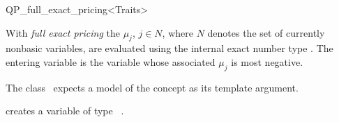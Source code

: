 
\begin{ccRefClass}{QP_full_exact_pricing<Traits>}

\ccDefinition
With \emph{full exact pricing} the $\mu_{j}$, $j \in N$, where $N$ denotes the
set of currently nonbasic variables, are evaluated using the
internal exact number type . The entering variable is the variable
whose associated $\mu_{j}$ is most negative.


\ccInheritsFrom
{}

\ccRequirements
\ccIndexRequirements

The class \ccRefName\ expects a model of the concept
 as its template argument. 

\ccTypes \ccIndexClassTypes


\ccCreation
\ccIndexClassCreation
{}

\ccConstructor{ ( );}
{creates a variable of type \ccRefName\ .}


\ccUnchecked

\ccAccessFunctions
\begin{ccIndexMemberFunctions}


\ccPredicates
{}



\end{ccIndexMemberFunctions}
\end{ccRefClass}
